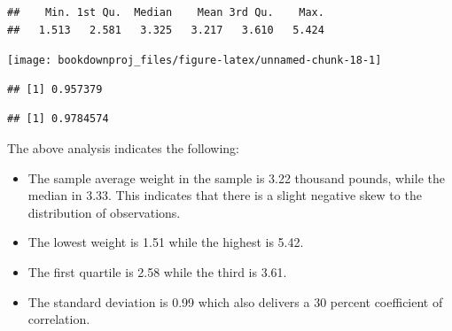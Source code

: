 \documentclass[
]{book}
\newenvironment{Shaded}{\begin{snugshade}}{\end{snugshade}}
\newcommand{\AttributeTok}[1]{\textcolor[rgb]{0.13,0.29,0.53}{#1}}
\newcommand{\CommentTok}[1]{\textcolor[rgb]{0.56,0.35,0.01}{\textit{#1}}}
\newcommand{\DecValTok}[1]{\textcolor[rgb]{0.00,0.00,0.81}{#1}}
\newcommand{\DocumentationTok}[1]{\textcolor[rgb]{0.56,0.35,0.01}{\textbf{\textit{#1}}}}
\newcommand{\FunctionTok}[1]{\textcolor[rgb]{0.13,0.29,0.53}{\textbf{#1}}}
\newcommand{\NormalTok}[1]{#1}
\newcommand{\SpecialCharTok}[1]{\textcolor[rgb]{0.81,0.36,0.00}{\textbf{#1}}}
\newcommand{\StringTok}[1]{\textcolor[rgb]{0.31,0.60,0.02}{#1}}
\begin{document}
\begin{Shaded}
\end{Shaded}

\begin{verbatim}
##    Min. 1st Qu.  Median    Mean 3rd Qu.    Max. 
##   1.513   2.581   3.325   3.217   3.610   5.424
\end{verbatim}

\begin{Shaded}
\end{Shaded}

\begin{center}\texttt{[image: bookdownproj\_files/figure-latex/unnamed-chunk-18-1]} \end{center}

\begin{Shaded}
\end{Shaded}

\begin{verbatim}
## [1] 0.957379
\end{verbatim}

\begin{Shaded}
\end{Shaded}

\begin{verbatim}
## [1] 0.9784574
\end{verbatim}

The above analysis indicates the following:

\begin{itemize}
\item
  The sample average weight in the sample is 3.22 thousand pounds, while the median in 3.33. This indicates that there is a slight negative skew to the distribution of observations.
\item
  The lowest weight is 1.51 while the highest is 5.42.
\item
  The first quartile is 2.58 while the third is 3.61.
\item
  The standard deviation is 0.99 which also delivers a 30 percent coefficient of correlation.
\end{itemize}
\end{document}
